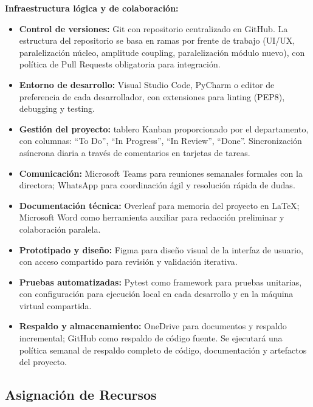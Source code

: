 \documentclass{article}
\begin{document}
\textbf{Infraestructura lógica y de colaboración:}
\begin{itemize}
    \item \textbf{Control de versiones:} Git con repositorio centralizado en GitHub. La estructura del repositorio se basa en ramas por frente de trabajo (UI/UX, paralelización núcleo, amplitude coupling, paralelización módulo nuevo), con política de Pull Requests obligatoria para integración.
    
    \item \textbf{Entorno de desarrollo:} Visual Studio Code, PyCharm o editor de preferencia de cada desarrollador, con extensiones para linting (PEP8), debugging y testing.
    
    \item \textbf{Gestión del proyecto:} tablero Kanban proporcionado por el departamento, con columnas: ``To Do'', ``In Progress'', ``In Review'', ``Done''. Sincronización asíncrona diaria a través de comentarios en tarjetas de tareas.
    
    \item \textbf{Comunicación:} Microsoft Teams para reuniones semanales formales con la directora; WhatsApp para coordinación ágil y resolución rápida de dudas.
    
    \item \textbf{Documentación técnica:} Overleaf para memoria del proyecto en LaTeX; Microsoft Word como herramienta auxiliar para redacción preliminar y colaboración paralela.
    
    \item \textbf{Prototipado y diseño:} Figma para diseño visual de la interfaz de usuario, con acceso compartido para revisión y validación iterativa.
    
    \item \textbf{Pruebas automatizadas:} Pytest como framework para pruebas unitarias, con configuración para ejecución local en cada desarrollo y en la máquina virtual compartida.
    
    \item \textbf{Respaldo y almacenamiento:} OneDrive para documentos y respaldo incremental; GitHub como respaldo de código fuente. Se ejecutará una política semanal de respaldo completo de código, documentación y artefactos del proyecto.
\end{itemize}





\subsection{Asignación de Recursos}
\end{document}
